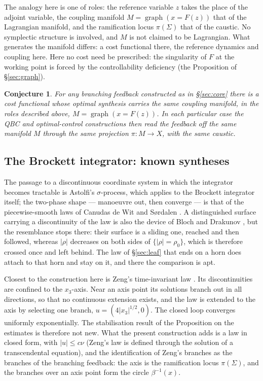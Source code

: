 \documentclass[11pt,reqno]{amsart}
\theoremstyle{plain}
\newtheorem*{conjecture}{Conjecture}
\theoremstyle{definition}
\theoremstyle{remark}
\DeclareMathOperator{\graph}{graph}
\newcommand{\Sig}{\Sigma}
\begin{document}
The analogy here is one of roles: the reference variable
$z$ takes the place of the adjoint variable, the coupling manifold $M=\graph(x=F(z))$ that of the
Lagrangian manifold, and the ramification locus $\pi(\Sig)$ that of the caustic. No symplectic
structure is involved, and $M$ is not claimed to be Lagrangian. What generates the manifold differs: a cost functional there, the reference dynamics and coupling here. Here no cost need be
prescribed: the singularity of $F$ at the working point is forced by the controllability deficiency (the
Proposition of \S\ref{sec:graph}).


\begin{conjecture}\label{conj:cost}
For any branching feedback constructed as in \S\ref{sec:core} there is a cost
functional whose optimal synthesis carries the same coupling manifold, in the roles described above,
$M=\graph(x=F(z))$. In each particular case the QBC and optimal-control constructions then read the
feedback off the same manifold $M$ through the same projection $\pi\colon M\to X$, with the same caustic.
\end{conjecture}

\subsection{The Brockett integrator: known syntheses}\label{sec:related}
The passage to a discontinuous coordinate system in which the integrator becomes tractable
is Astolfi's $\sigma$-process, which \cite{Astolfi1998} applies to the Brockett integrator itself; the two-phase shape --- manoeuvre out,
then converge --- is that of the piecewise-smooth laws of Canudas de Wit and S\o rdalen
\cite{CanudasSordalen1992}. A distinguished surface carrying a discontinuity of the law is
also the device of Bloch and Drakunov \cite{BlochDrakunov1994}, but the resemblance stops
there: their surface is a sliding one, reached and then followed, whereas $|\rho|$
decreases on both sides of $\{|\rho|=\rho_0\}$, which is therefore crossed once and left
behind. The law of \S\ref{sec:leaf} that ends on a horn does attach to that horn and
stay on it, and there the comparison is apt.

Closest to the construction here is Zeng's time-invariant law \cite{Zeng2022}. Its
discontinuities are confined to the $x_3$-axis. Near an axis point its solutions branch out in all
directions, so that no continuous extension exists, and the law is extended to the axis by
selecting one branch, $u=(4|x_3|^{1/2},0)$. The closed loop converges uniformly exponentially. The
stabilisation result of the Proposition on the estimates is therefore not new. What the present
construction adds is a law in closed form, with $|u|\le c\nu$ (Zeng's law is defined through the
solution of a transcendental equation), and the identification of Zeng's branches as the branches of
the branching feedback: the axis is the ramification locus $\pi(\Sig)$, and the branches over an axis
point form the circle $\beta^{-1}(x)$.
\end{document}
